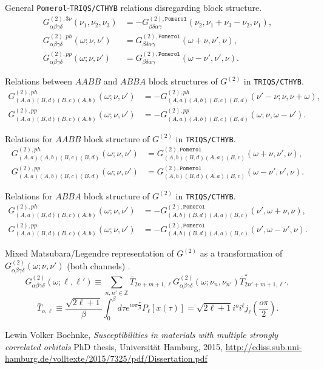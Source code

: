 \documentclass[a4paper,12pt]{article}
\renewcommand{\t}{\ensuremath{\tau}}
\newcommand{\w}{\ensuremath{\omega}}
\newcommand{\n}{\ensuremath{\nu}}
\newcommand{\pom}{\ensuremath{\mathtt{Pomerol}}}
\begin{document}
General \texttt{Pomerol}-\texttt{TRIQS/CTHYB} relations disregarding block
structure.
\begin{align}
	G^{(2),3\nu}_{\alpha\beta\gamma\delta}(\nu_1,\nu_2,\nu_3) &=
	-G^{(2),\pom}_{\beta\delta\alpha\gamma}(\nu_2,\nu_1+\nu_3-\nu_2,\nu_1),\\
	G^{(2),ph}_{\alpha\beta\gamma\delta}(\w;\n,\n') &=
	G^{(2),\pom}_{\beta\delta\alpha\gamma}(\w+\n,\n',\n),\\
	G^{(2),pp}_{\alpha\beta\gamma\delta}(\w;\n,\n') &=
	G^{(2),\pom}_{\beta\delta\alpha\gamma}(\w-\n',\n',\n).
\end{align}

Relations between $AABB$ and $ABBA$ block structures of $G^{(2)}$  in
\texttt{TRIQS/CTHYB}.
\begin{align}
G^{(2),ph}_{(A,a)(B,d)(B,c)(A,b)}(\w;\n,\n') &= -
G^{(2),ph}_{(A,a)(A,b)(B,c)(B,d)}(\n'-\n;\n,\n+\w),\\
G^{(2),pp}_{(A,a)(B,d)(B,c)(A,b)}(\w;\n,\n') &= -
G^{(2),pp}_{(A,a)(A,b)(B,c)(B,d)}(\w;\n,\w-\n').
\end{align}

Relations for $AABB$ block structure of $G^{(2)}$ in \texttt{TRIQS/CTHYB}.
\begin{align}
	G^{(2),ph}_{(A,a)(A,b)(B,c)(B,d)}(\w;\n,\n') &=
	G^{(2),\pom}_{(A,b)(B,d)(A,a)(B,c)}(\w+\n,\n',\n),\\
	G^{(2),pp}_{(A,a)(A,b)(B,c)(B,d)}(\w;\n,\n') &=
	G^{(2),\pom}_{(A,b)(B,d)(A,a)(B,c)}(\w-\n',\n',\n).
\end{align}

Relations for $ABBA$ block structure of $G^{(2)}$ in \texttt{TRIQS/CTHYB}.
\begin{align}
	G^{(2),ph}_{(A,a)(B,d)(B,c)(A,b)}(\w;\n,\n') &= -
	G^{(2),\pom}_{(A,b)(B,d)(A,a)(B,c)}(\n',\w+\n,\n),\\
	G^{(2),pp}_{(A,a)(B,d)(B,c)(A,b)}(\w;\n,\n') &= -
	G^{(2),\pom}_{(A,b)(B,d)(A,a)(B,c)}(\n',\w-\n',\n).
\end{align}

Mixed Matsubara/Legendre representation of $G^{(2)}$ as a transformation of
$G^{(2)}_{\alpha\beta\gamma\delta}(\w;\nu,\nu')$ (both channels)
\cite{LewinThesis}.
\begin{equation}\label{legendre_transform}
	G^{(2)}_{\alpha\beta\gamma\delta}(\w;\ell,\ell') \equiv
	\sum_{n,n'\in\mathbb{Z}}
	\bar T_{2n+m+1,\ell}
	G^{(2)}_{\alpha\beta\gamma\delta}(\w;\nu_n,\nu_{n'})
	\bar T^*_{2n'+m+1,\ell'},
\end{equation}
\begin{equation}
	\bar T_{o,\ell} \equiv \frac{\sqrt{2\ell+1}}{\beta}
	\int_0^\beta d\t e^{io\pi\frac{\t}{\beta}} P_\ell[x(\t)] =
	\sqrt{2\ell+1}i^o i^\ell j_\ell\left(\frac{o\pi}{2}\right).
\end{equation}



\begin{thebibliography}{9}
	Lewin Volker Boehnke,
	\emph{Susceptibilities in materials with multiple strongly correlated 
	orbitals}
	PhD thesis, Universit\"at Hamburg, 2015,
	\url{http://ediss.sub.uni-hamburg.de/volltexte/2015/7325/pdf/Dissertation.pdf}
\end{thebibliography}
\end{document}
